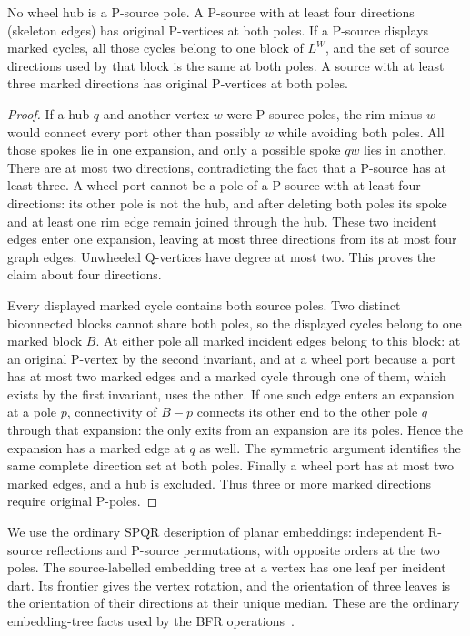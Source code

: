 \begin{lemma}
\label{cse:source}
No wheel hub is a P-source pole. A P-source with at least four directions
(skeleton edges) has original P-vertices at both poles. If a P-source displays marked cycles,
all those cycles belong to one block of $L^W$, and the set of source
directions used by that block is the same at both poles. A source with at
least three marked directions has original P-vertices at both poles.
\end{lemma}
\begin{proof}
If a hub $q$ and another vertex $w$ were P-source poles, the rim minus
$w$ would connect every port other than possibly $w$ while avoiding both
poles. All those spokes lie in one expansion, and only a possible spoke
$qw$ lies in another. There are at most two directions, contradicting the
fact that a P-source has at least three. A wheel port cannot be a pole of a
P-source with at least four directions: its other pole is not the hub, and after
deleting both poles its spoke and at least one rim edge remain joined
through the hub. These two incident edges enter one expansion, leaving
at most three directions from its at most four graph edges. Unwheeled
Q-vertices have degree at most two. This proves the claim about four
directions.

Every displayed marked cycle contains both source poles. Two distinct
biconnected blocks cannot share both poles, so the displayed cycles
belong to one marked block $B$. At either pole all marked incident edges
belong to this block: at an original P-vertex by the second invariant, and
at a wheel port because a port has at most two marked edges and a marked
cycle through one of them, which exists by the first invariant, uses the
other. If one such edge
enters an expansion at a pole $p$, connectivity of $B-p$ connects its
other end to the other pole $q$ through that expansion: the only exits
from an expansion are its poles. Hence the expansion has a marked edge
at $q$ as well. The symmetric argument identifies the same complete
direction set at both poles. Finally a wheel port has at most two marked
edges, and a hub is excluded. Thus three or more marked directions
require original P-poles.
\end{proof}

We use the ordinary SPQR description of planar embeddings: independent
R-source reflections and P-source permutations, with opposite orders at
the two poles. The source-labelled embedding tree at a vertex has one
leaf per incident dart. Its frontier gives the vertex rotation, and the
orientation of three leaves is the orientation of their directions at
their unique median. These are the ordinary embedding-tree facts used by
the BFR operations~\cite{bfr}.

